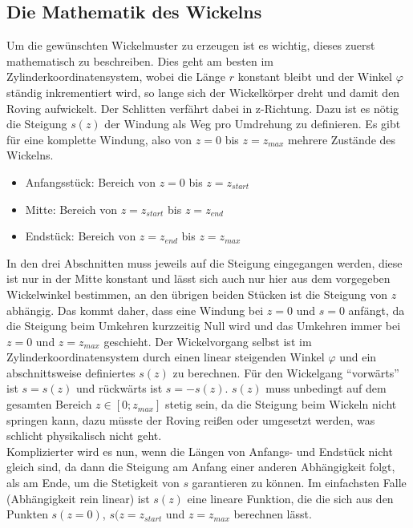 \documentclass[paper=A4,pagesize,DIV=18, 12pt,listof=totoc,bibliography=totoc,headings=optiontohead,open=any]{article}
\begin{document}



\subsection{Die Mathematik des Wickelns}
\label{mathematik}
Um die gewünschten Wickelmuster zu erzeugen ist es wichtig, dieses zuerst mathematisch zu beschreiben. Dies geht am besten im Zylinderkoordinatensystem, wobei die Länge $r$ konstant bleibt und der Winkel $\varphi$ ständig inkrementiert wird, so lange sich der Wickelkörper dreht und damit den Roving aufwickelt. Der Schlitten verfährt dabei in z-Richtung. Dazu ist es nötig die Steigung $s(z)$ der Windung als Weg pro Umdrehung zu definieren. Es gibt für eine komplette Windung, also von $z = 0$ bis $z = z_{max}$ mehrere Zustände des Wickelns.\\
\begin{itemize}
	\item Anfangsstück: Bereich von $z = 0$ bis $z = z_{start}$
	\item Mitte: Bereich von $z = z_{start}$ bis $z = z_{end}$
	\item Endstück: Bereich von $z = z_{end}$ bis $z = z_{max}$
\end{itemize}
In den drei Abschnitten muss jeweils auf die Steigung eingegangen werden, diese ist nur in der Mitte konstant und lässt sich auch nur hier aus dem vorgegeben Wickelwinkel bestimmen, an den übrigen beiden Stücken ist die Steigung von $z$ abhängig. Das kommt daher, dass eine Windung bei $z = 0$ und $s = 0$ anfängt, da die Steigung beim Umkehren kurzzeitig Null wird und das Umkehren immer bei $z = 0$ und $z = z_{max}$ geschieht. Der Wickelvorgang selbst ist im Zylinderkoordinatensystem durch einen linear steigenden Winkel $\varphi$ und ein abschnittsweise definiertes $s(z)$ zu berechnen. Für den Wickelgang \enquote{vorwärts} ist $s = s(z)$ und rückwärts ist $s = -s(z)$. $s(z)$ muss unbedingt auf dem gesamten Bereich $z \in [0; z_{max}]$ stetig sein, da die Steigung beim Wickeln nicht springen kann, dazu müsste der Roving reißen oder umgesetzt werden, was schlicht physikalisch nicht geht.\\
Komplizierter wird es nun, wenn die Längen von Anfangs- und Endstück nicht gleich sind, da dann die Steigung am Anfang einer anderen Abhängigkeit folgt, als am Ende, um die Stetigkeit von $s$ garantieren zu können. Im einfachsten Falle (Abhängigkeit rein linear) ist $s(z)$ eine lineare Funktion, die die sich aus den Punkten $s(z = 0)$, $s(z = z_{start}$ und $z = z_{max}$ berechnen lässt.\\
\end{document}
